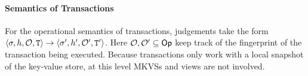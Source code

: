 \paragraph{Semantics of Transactions}
For the operational semantics of transactions, 
judgements take the form $\langle \sigma, h, \mathcal{O}, \texttt{T} \rangle 
\rightarrow \langle \sigma', h', \mathcal{O}', \texttt{T}' \rangle$. Here $\mathcal{O}, \mathcal{O}' \subseteq \mathsf{Op}$ 
keep track of the fingerprint of the transaction being executed. Because transactions only work with a local 
snapshot of the key-value store, at this level MKVSs and views are not involved.

